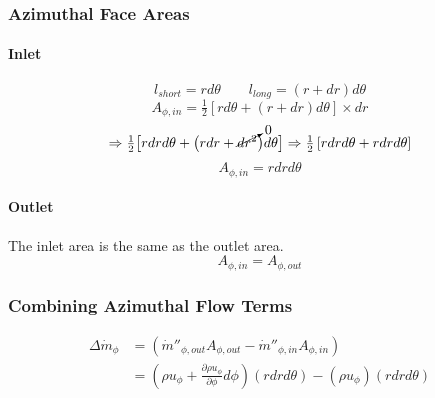 \documentclass[12pt, letterpaper, twoside]{article}
\begin{document}
        \subsubsection{Azimuthal Face Areas}
        \paragraph{Inlet}
            \begin{equation*}
                l_{short} = r d\theta \qquad
                l_{long} = (r + dr) d\theta 
            \end{equation*}
            \begin{equation}\label{eq:Aphi_init}
                A_{\phi,in} = \tfrac{1}{2} \left[rd\theta + \left(r+dr\right)d\theta\right] \times dr
            \end{equation}
            \begin{equation*}
                \Rightarrow
                \tfrac{1}{2} \big[r dr d\theta +  \big(rdr + \cancelto{0}{dr^2}\big) d\theta \big] 
                \Rightarrow
                \tfrac{1}{2} \left[r dr d\theta + r dr d\theta\right]
            \end{equation*}
            \begin{equation}\label{eq:Athetain_final}
                A_{\phi,in} = r dr d\theta
            \end{equation}
        \paragraph{Outlet}
            The inlet area is the same as the outlet area.
            \begin{equation}
                A_{\phi,in} = A_{\phi,out}
            \end{equation}

        \subsubsection{Combining Azimuthal Flow Terms}
            \begin{equation*}
            \begin{split}
                \Delta\dot{m}_{\phi} & = (\dot{m}''_{\phi,out} A_{\phi,out} - \dot{m}''_{\phi,in} A_{\phi,in}) \\
                & = \left( \rho u_{\phi}  + \frac{\partial \rho u_{\phi}}{\partial \phi} d\phi \right)
                \left(r dr d\theta \right) -
                \left(\rho u_{\phi} \right) \left(r dr d\theta \right)
            \end{split}
            \end{equation*}
\end{document}
